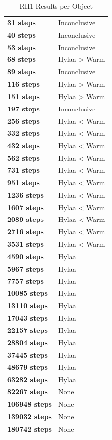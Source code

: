 \documentclass{article}\usepackage[]{graphicx}\usepackage[]{color}
\begin{document}
	
	\begin{table}[H]
	\centering
	\caption{RH1 Results per Object}
	\begin{tabular}{ll}
	\textbf{31 steps} & Inconclusive \\
	\textbf{40 steps} & Inconclusive \\
	\textbf{53 steps} & Inconclusive \\
	\textbf{68 steps} & Hylaa \textgreater{} Warm \\
	\textbf{89 steps} & Inconclusive \\
	\textbf{116 steps} & Hylaa \textgreater{} Warm \\
	\textbf{151 steps} & Hylaa \textgreater{} Warm \\
	\textbf{197 steps} & Inconclusive \\
	\textbf{256 steps} & Hylaa \textless{} Warm \\
	\textbf{332 steps} & Hylaa \textless{} Warm \\
	\textbf{432 steps} & Hylaa \textless{} Warm \\
	\textbf{562 steps} & Hylaa \textless{} Warm \\
	\textbf{731 steps} & Hylaa \textless{} Warm \\
	\textbf{951 steps} & Hylaa \textless{} Warm \\
	\textbf{1236 steps} & Hylaa \textless{} Warm \\
	\textbf{1607 steps} & Hylaa \textless{} Warm \\
	\textbf{2089 steps} & Hylaa \textless{} Warm \\
	\textbf{2716 steps} & Hylaa \textless{} Warm \\
	\textbf{3531 steps} & Hylaa \textless{} Warm \\
	\textbf{4590 steps} & Hylaa \\
	\textbf{5967 steps} & Hylaa \\
	\textbf{7757 steps} & Hylaa \\
	\textbf{10085 steps} & Hylaa \\
	\textbf{13110 steps} & Hylaa \\
	\textbf{17043 steps} & Hylaa \\
	\textbf{22157 steps} & Hylaa \\
	\textbf{28804 steps} & Hylaa \\
	\textbf{37445 steps} & Hylaa \\
	\textbf{48679 steps} & Hylaa \\
	\textbf{63282 steps} & Hylaa \\
	\textbf{82267 steps} & None \\
	\textbf{106948 steps} & None \\
	\textbf{139032 steps} & None \\
	\textbf{180742 steps} & None \\
	\end{tabular}
	\end{table}
\end{document}
